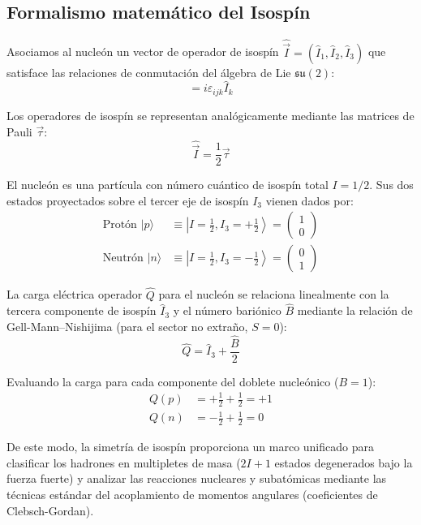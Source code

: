 \subsection{Formalismo matemático del Isospín}

Asociamos al nucleón un vector de operador de isospín $\hat{\vec{I}} = (\hat{I}_1, \hat{I}_2, \hat{I}_3)$ que satisface las relaciones de conmutación del álgebra de Lie $\mathfrak{su}(2)$:
\begin{equation}
    [\hat{I}_i, \hat{I}_j] = i \varepsilon_{ijk} \hat{I}_k
\end{equation}

Los operadores de isospín se representan analógicamente mediante las matrices de Pauli $\vec{\tau}$:
\begin{equation}
    \hat{\vec{I}} = \frac{1}{2} \vec{\tau}
\end{equation}

El nucleón es una partícula con número cuántico de isospín total $I = 1/2$. Sus dos estados proyectados sobre el tercer eje de isospín $I_3$ vienen dados por:
\begin{align}
    \text{Protón } |p\rangle &\equiv \left| I = \frac{1}{2}, I_3 = +\frac{1}{2} \right\rangle = \begin{pmatrix} 1 \\ 0 \end{pmatrix} \\
    \text{Neutrón } |n\rangle &\equiv \left| I = \frac{1}{2}, I_3 = -\frac{1}{2} \right\rangle = \begin{pmatrix} 0 \\ 1 \end{pmatrix}
\end{align}

La carga eléctrica operador $\hat{Q}$ para el nucleón se relaciona linealmente con la tercera componente de isospín $\hat{I}_3$ y el número bariónico $\hat{B}$ mediante la relación de Gell-Mann--Nishijima (para el sector no extraño, $S = 0$):
\begin{equation}
    \hat{Q} = \hat{I}_3 + \frac{\hat{B}}{2}
\end{equation}

Evaluando la carga para cada componente del doblete nucleónico ($B = 1$):
\begin{align}
    Q(p) &= +\frac{1}{2} + \frac{1}{2} = +1 \\
    Q(n) &= -\frac{1}{2} + \frac{1}{2} = 0
\end{align}

De este modo, la simetría de isospín proporciona un marco unificado para clasificar los hadrones en multipletes de masa ($2I + 1$ estados degenerados bajo la fuerza fuerte) y analizar las reacciones nucleares y subatómicas mediante las técnicas estándar del acoplamiento de momentos angulares (coeficientes de Clebsch-Gordan).

